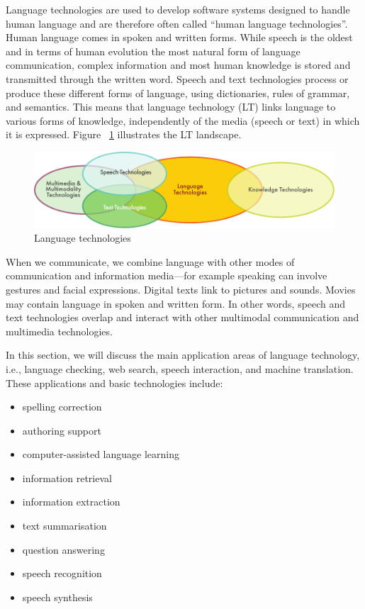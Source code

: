 \begin{multicols}{2}
Language technologies are used to develop software systems designed to handle human language and are therefore often called “human language technologies”. Human language comes in spoken and written forms. While speech is the oldest and in terms of human evolution the most natural form of language communication, complex information and most human knowledge is stored and transmitted through the written word. Speech and text technologies process or produce these different forms of language, using dictionaries, rules of grammar, and semantics. This means that language technology (LT) links language to various forms of knowledge, independently of the media (speech or text) in which it is expressed. Figure ~\ref{fig:ltincontext_en} illustrates the LT landscape.

\begin{figure}[htb]
  \center
  \includegraphics[width=\textwidth]{../_media/english/language_technologies}
  \caption{Language technologies}
  \label{fig:ltincontext_en}
\end{figure}

When we communicate, we combine language with other modes of communication and information media—for example speaking can involve gestures and facial expressions. Digital texts link to pictures and sounds. Movies may contain language in spoken and written form. In other words, speech and text technologies overlap and interact with other multimodal communication and multimedia technologies.

In this section, we will discuss the main application areas of language technology, i.e., language checking, web search, speech interaction, and machine translation. These applications and basic technologies include:

\begin{itemize}
\item spelling correction
\item authoring support
\item computer-assisted language learning
\item information retrieval
\item information extraction
\item text summarisation
\item question answering
\item speech recognition
\item speech synthesis
\end{itemize}


\end{multicols}
